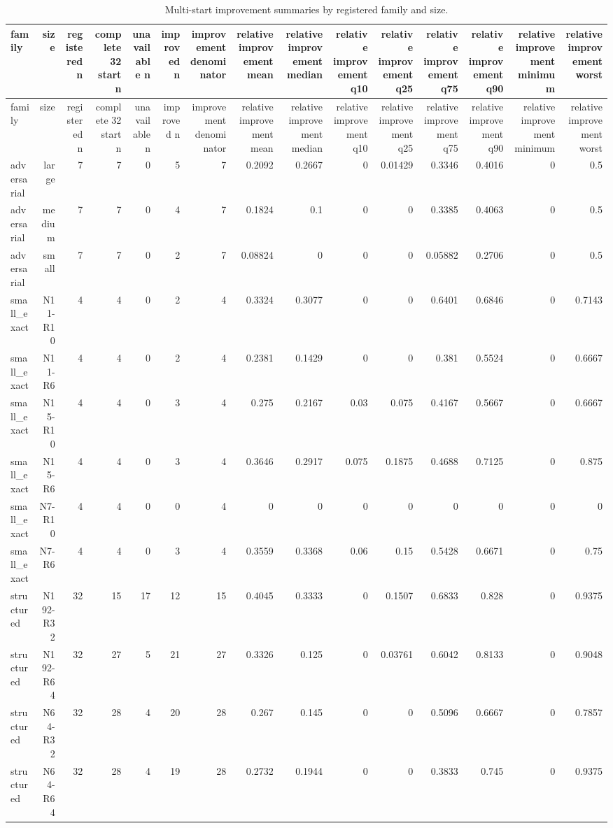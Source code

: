 {\footnotesize
\begin{longtable}{lrrrrrrrrrrrrrr}
\caption{Multi-start improvement summaries by registered family and size.}\label{tab:aor-multistart-summary}\\
\toprule
family & size & registered n & complete 32 start n & unavailable n & improved n & improvement denominator & relative improvement mean & relative improvement median & relative improvement q10 & relative improvement q25 & relative improvement q75 & relative improvement q90 & relative improvement minimum & relative improvement worst \\
\midrule
\endfirsthead
\toprule
family & size & registered n & complete 32 start n & unavailable n & improved n & improvement denominator & relative improvement mean & relative improvement median & relative improvement q10 & relative improvement q25 & relative improvement q75 & relative improvement q90 & relative improvement minimum & relative improvement worst \\
\midrule
\endhead
adversarial & large & 7 & 7 & 0 & 5 & 7 & 0.2092 & 0.2667 & 0 & 0.01429 & 0.3346 & 0.4016 & 0 & 0.5 \\
adversarial & medium & 7 & 7 & 0 & 4 & 7 & 0.1824 & 0.1 & 0 & 0 & 0.3385 & 0.4063 & 0 & 0.5 \\
adversarial & small & 7 & 7 & 0 & 2 & 7 & 0.08824 & 0 & 0 & 0 & 0.05882 & 0.2706 & 0 & 0.5 \\
small\_exact & N11-R10 & 4 & 4 & 0 & 2 & 4 & 0.3324 & 0.3077 & 0 & 0 & 0.6401 & 0.6846 & 0 & 0.7143 \\
small\_exact & N11-R6 & 4 & 4 & 0 & 2 & 4 & 0.2381 & 0.1429 & 0 & 0 & 0.381 & 0.5524 & 0 & 0.6667 \\
small\_exact & N15-R10 & 4 & 4 & 0 & 3 & 4 & 0.275 & 0.2167 & 0.03 & 0.075 & 0.4167 & 0.5667 & 0 & 0.6667 \\
small\_exact & N15-R6 & 4 & 4 & 0 & 3 & 4 & 0.3646 & 0.2917 & 0.075 & 0.1875 & 0.4688 & 0.7125 & 0 & 0.875 \\
small\_exact & N7-R10 & 4 & 4 & 0 & 0 & 4 & 0 & 0 & 0 & 0 & 0 & 0 & 0 & 0 \\
small\_exact & N7-R6 & 4 & 4 & 0 & 3 & 4 & 0.3559 & 0.3368 & 0.06 & 0.15 & 0.5428 & 0.6671 & 0 & 0.75 \\
structured & N192-R32 & 32 & 15 & 17 & 12 & 15 & 0.4045 & 0.3333 & 0 & 0.1507 & 0.6833 & 0.828 & 0 & 0.9375 \\
structured & N192-R64 & 32 & 27 & 5 & 21 & 27 & 0.3326 & 0.125 & 0 & 0.03761 & 0.6042 & 0.8133 & 0 & 0.9048 \\
structured & N64-R32 & 32 & 28 & 4 & 20 & 28 & 0.267 & 0.145 & 0 & 0 & 0.5096 & 0.6667 & 0 & 0.7857 \\
structured & N64-R64 & 32 & 28 & 4 & 19 & 28 & 0.2732 & 0.1944 & 0 & 0 & 0.3833 & 0.745 & 0 & 0.9375 \\
\bottomrule
\end{longtable}
}
